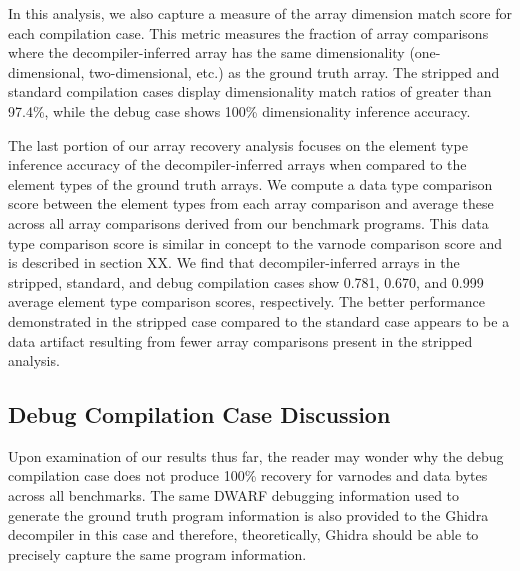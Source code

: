 \documentclass[conference]{IEEEtran}
\begin{document}
In this analysis, we also capture a measure of the array dimension match score for each compilation case. This metric measures the fraction of array comparisons where the decompiler-inferred array has the same dimensionality (one-dimensional, two-dimensional, etc.) as the ground truth array. The stripped and standard compilation cases display dimensionality match ratios of greater than 97.4\%, while the debug case shows 100\% dimensionality inference accuracy.

The last portion of our array recovery analysis focuses on the element type inference accuracy of the decompiler-inferred arrays when compared to the element types of the ground truth arrays. We compute a data type comparison score between the element types from each array comparison and average these across all array comparisons derived from our benchmark programs. This data type comparison score is similar in concept to the varnode comparison score and is described in section XX. We find that decompiler-inferred arrays in the stripped, standard, and debug compilation cases show 0.781, 0.670, and 0.999 average element type comparison scores, respectively. The better performance demonstrated in the stripped case compared to the standard case appears to be a data artifact resulting from fewer array comparisons present in the stripped analysis.

\subsection{Debug Compilation Case Discussion}

Upon examination of our results thus far, the reader may wonder why the debug compilation case does not produce 100\% recovery for varnodes and data bytes across all benchmarks. The same DWARF debugging information used to generate the ground truth program information is also provided to the Ghidra decompiler in this case and therefore, theoretically, Ghidra should be able to precisely capture the same program information.
\end{document}
